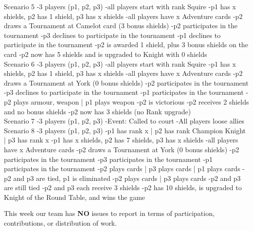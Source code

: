 \documentclass[12pt]{article} %
\begin{document}
Scenario 5
-3 players (p1, p2, p3)
-all players start with rank Squire
-p1 has x shields, p2 has 1 shield, p3 has x shields
-all players have x Adventure cards
-p2 draws a Tournament at Camelot card (3 bonus shields)
-p2 participates in the tournament
-p3 declines to participate in the tournament
-p1 declines to participate in the tournament
-p2 is awarded 1 shield, plus 3 bonus shields on the card
-p2 now has 5 shields and is upgraded to Knight with 0 shields\\

Scenario 6
-3 players (p1, p2, p3)
-all players start with rank Squire
-p1 has x shields, p2 has 1 shield, p3 has x shields
-all players have x Adventure cards
-p2 draws a Tournament at York (0 bonus shields)
-p2 participates in the tournament
-p3 declines to participate in the tournament
-p1 participates in the tournament
-p2 plays armour, weapon | p1 plays weapon
-p2 is victorious
-p2 receives 2 shields and no bonus shields
-p2 now has 3 shields (no Rank upgrade)\\

Scenario 7
-3 players (p1, p2, p3)
-Event: Called to court
-All players loose allies\\

Scenario 8
-3 players (p1, p2, p3)
-p1 has rank x | p2 has rank Champion Knight | p3 has rank x
-p1 has x shields, p2 has 7 shields, p3 has x shields
-all players have x Adventure cards
-p2 draws a Tournament at York (0 bonus shields)
-p2 participates in the tournament
-p3 participates in the tournament
-p1 participates in the tournament
-p2 plays  cards | p3 plays cards | p1 plays cards
-p2 and p3 are tied, p1 is eliminated
-p2 plays cards | p3 plays cards
-p2 and p3 are still tied
-p2 and p3 each receive 3 shields
-p2 has 10 shields, is upgraded to Knight of the Round Table, and wins the game\\
\egroup

This week our team has \textbf{NO} issues to report in terms of participation, contributions, or distribution of work.




\end{document}
